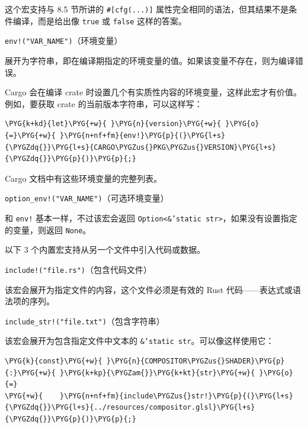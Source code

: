 这个宏支持与 8.5 节所讲的 \texttt{\#[cfg(...)]} 属性完全相同的语法，但其结果不是条件编译，而是给出像 \texttt{true} 或 \texttt{false} 这样的答案。

\begin{mySidenote}
\texttt{env!("VAR\_NAME")}（环境变量）
\end{mySidenote}

展开为字符串，即在编译期指定的环境变量的值。如果该变量不存在，则为编译错误。

Cargo 会在编译 crate 时设置几个有实质性内容的环境变量，这样此宏才有价值。例如，要获取 crate 的当前版本字符串，可以这样写：

\begin{Verbatim}[commandchars=\\\{\},breaklines=true,breakanywhere=true,fontsize=\codefont,xleftmargin=17bp]
\PYG{k+kd}{let}\PYG{+w}{ }\PYG{n}{version}\PYG{+w}{ }\PYG{o}{=}\PYG{+w}{ }\PYG{n+nf+fm}{env!}\PYG{p}{(}\PYG{l+s}{\PYGZdq{}}\PYG{l+s}{CARGO\PYGZus{}PKG\PYGZus{}VERSION}\PYG{l+s}{\PYGZdq{}}\PYG{p}{)}\PYG{p}{;}
\end{Verbatim}

Cargo 文档中有这些环境变量的完整列表。

\begin{myNote}
\texttt{option\_env!("VAR\_NAME")}（可选环境变量）
\end{myNote}

和 \texttt{env!} 基本一样，不过该宏会返回 \texttt{Option<\&'static str>}，如果没有设置指定的变量，则返回 \texttt{None}。

以下 3 个内置宏支持从另一个文件中引入代码或数据。

\begin{mySidenote}
\texttt{include!("file.rs")}（包含代码文件）
\end{mySidenote}

该宏会展开为指定文件的内容，这个文件必须是有效的 Rust 代码——表达式或语法项的序列。

\begin{myNote}
\texttt{include\_str!("file.txt")}（包含字符串）
\end{myNote}

该宏会展开为包含指定文件中文本的 \texttt{\&'static str}。可以像这样使用它：

\begin{Verbatim}[commandchars=\\\{\},breaklines=true,breakanywhere=true,fontsize=\codefont,xleftmargin=17bp]
\PYG{k}{const}\PYG{+w}{ }\PYG{n}{COMPOSITOR\PYGZus{}SHADER}\PYG{p}{:}\PYG{+w}{ }\PYG{k+kp}{\PYGZam{}}\PYG{k+kt}{str}\PYG{+w}{ }\PYG{o}{=}
\PYG{+w}{    }\PYG{n+nf+fm}{include\PYGZus{}str!}\PYG{p}{(}\PYG{l+s}{\PYGZdq{}}\PYG{l+s}{../resources/compositor.glsl}\PYG{l+s}{\PYGZdq{}}\PYG{p}{)}\PYG{p}{;}
\end{Verbatim}

